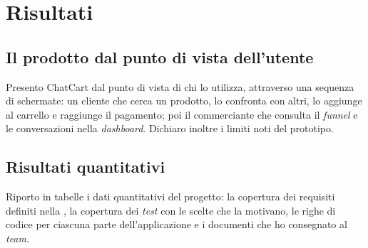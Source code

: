 
\section{Risultati}

\subsection{Il prodotto dal punto di vista dell’utente}

Presento ChatCart dal punto di vista di chi lo utilizza, attraverso una sequenza di schermate: un
cliente che cerca un prodotto, lo confronta con altri, lo aggiunge al carrello e raggiunge il
pagamento; poi il commerciante che consulta il \emph{funnel} e le conversazioni nella
\emph{dashboard}. Dichiaro inoltre i limiti noti del prototipo.

\subsection{Risultati quantitativi}
\label{sec:quantitativi}

Riporto in tabelle i dati quantitativi del progetto: la copertura dei requisiti definiti nella
, la copertura dei \emph{test} con le scelte che la motivano, le righe di
codice per ciascuna parte dell’applicazione e i documenti che ho consegnato al \emph{team}.
